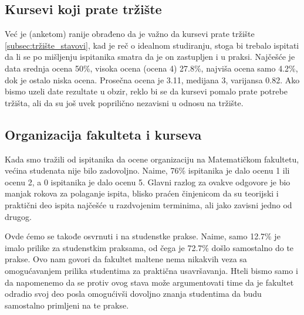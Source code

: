 \documentclass[a4paper]{article}
\begin{document}
{\subsection{Kursevi koji prate tržište}
\label{subsec:tržište_iskustva}

Već je (anketom) ranije obrađeno da je važno da kursevi prate tržište \ref{subsec:tržište_stavovi}, kad je reč o idealnom studiranju, stoga bi trebalo ispitati da li se po mišljenju ispitanika smatra da je on zastupljen i u praksi. Najčešće je data srednja ocena 50\%, visoka ocena (ocena 4) 27.8\%, najviša ocena samo 4.2\%, dok je ostalo niska ocena. Prosečna ocena je 3.11, medijana 3, varijansa 0.82. Ako bismo uzeli date rezultate u obzir, reklo bi se da kursevi pomalo prate potrebe tržišta, ali da su još uvek poprilično nezavisni u odnosu na tržište.

\subsection{Organizacija fakulteta i kurseva}
\label{subsec:organizacija_iskustva}

Kada smo tražili od ispitanika da ocene organizaciju na Matematičkom fakultetu, većina studenata nije bilo zadovoljno. Naime, 76\% ispitanika je dalo ocenu 1 ili ocenu 2, a 0 ispitanika je dalo ocenu 5. Glavni razlog za ovakve odgovore je bio manjak rokova za polaganje ispita, blisko praćen činjenicom da su teorijski i praktični deo ispita najčešće u razdvojenim terminima, ali jako zavisni jedno od drugog.

Ovde ćemo se takođe osvrnuti i na studenstke prakse. Naime, samo 12.7\% je imalo prilike za studenstkim praksama, od čega je 72.7\% došlo samostalno do te prakse. Ovo nam govori da fakultet maltene nema nikakvih veza sa omogućavanjem prilika studentima za praktična usavršavanja. Hteli bismo samo i da napomenemo da se protiv ovog stava može argumentovati time da je fakultet odradio svoj deo posla omogućivši dovoljno znanja studentima da budu samostalno primljeni na te prakse.

}
\end{document}
